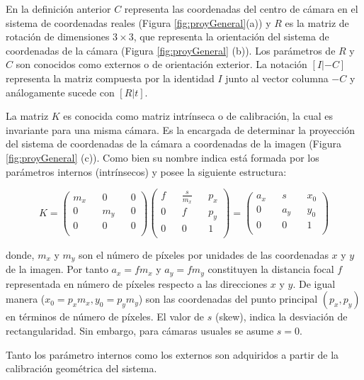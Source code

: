 En la definición anterior $C$ representa las coordenadas del centro de cámara en el sistema de coordenadas reales (Figura \ref{fig:proyGeneral}(a)) y $R$ es la matriz de rotación de dimensiones $3 \times 3$, que representa la orientación del sistema de coordenadas de la cámara (Figura \ref{fig:proyGeneral} (b)). Los parámetros de $R$ y $C$ son conocidos como externos o de orientación exterior. La notación $[I| - C]$ representa la matriz compuesta por la identidad $I$ junto al vector columna $-C$ y análogamente sucede con $[R|t]$.

La matriz $K$ es conocida como matriz intrínseca o de calibración, la cual es invariante para una misma cámara. Es la encargada de determinar la proyección del sistema de coordenadas de la cámara a coordenadas de la imagen (Figura \ref{fig:proyGeneral} (c)). Como bien su nombre indica está formada por los parámetros internos (intrínsecos) y posee la siguiente estructura:

\begin{equation}
	K = \begin{pmatrix}
		m_x && 0 && 0 \\
		0 && m_y && 0 \\
		0 && 0 && 0 \\
	\end{pmatrix}
	\begin{pmatrix}
		f && \frac{s}{m_x} && p_x \\
		0 && f && p_y \\
		0 && 0 && 1 \\
	\end{pmatrix} =
	\begin{pmatrix}
		a_x && s && x_0 \\
		0 && a_y && y_0 \\
		0 && 0 && 1 \\
	\end{pmatrix}
\end{equation}

donde, $m_x$ y $m_y$ son el número de píxeles por unidades de las coordenadas $x$ y $y$ de la imagen. Por tanto $a_x = fm_x$ y $a_y = fm_y$ constituyen la distancia focal $f$ representada en número de píxeles respecto a las direcciones $x$ y $y$. De igual manera ($x_0 = p_xm_x, y_0 = p_ym_y$) son las coordenadas del punto principal $(p_x, p_y)$ en términos de número de píxeles. El valor de $s$ (skew), indica la desviación de rectangularidad. Sin embargo, para cámaras usuales se asume $s=0$.

Tanto los parámetro internos como los externos son adquiridos a partir de la calibración geométrica del sistema.

